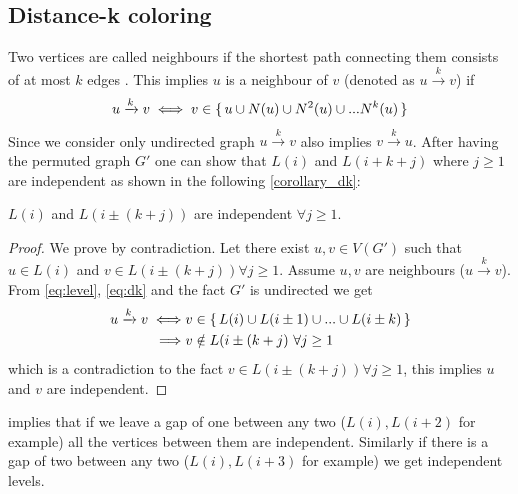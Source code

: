  \subsection{Distance-k coloring} \label{subsec:DK}
 Two vertices are called \DK neighbours if the shortest path connecting them consists of at most $k$ edges \cite{dist_k_def}. This implies $u$ is a \DK neighbour of $v$ (denoted as $u\xrightarrow{k}v$)  if
 \begin{equation}\label{eq:dk}
	  u\xrightarrow{k}v  \iff  v \in \set{ u \cup N(u) \cup N^2(u) \cup ... N^k(u) }	 
 \end{equation}
 Since we consider only undirected graph $u\xrightarrow{k}v$ also implies $v\xrightarrow{k}u$. 
  After having the permuted graph $G'$ one can show that $L(i)$ and $L(i+k+j)$ where $j\geq1$ are \DK independent as shown in the following \cref{corollary_dk}:
  \begin{corollary}\label{corollary_dk}
   $L(i)$ and $L(i\pm(k+j))$ are \DK independent $\forall j\geq1$. 
  \end{corollary}
  \begin{proof}
  	We prove by contradiction. Let there exist $u,v \in V(G')$ such that  $u \in L(i)$ and $v \in  L(i \pm (k+j)) \forall j\geq1$. Assume $u,v$ are \DK neighbours ($u\xrightarrow{k}v$). From \cref{eq:level}, \cref{eq:dk} and the fact $G'$ is undirected we get 
  	\begin{align*}
	  	u\xrightarrow{k}v \iff & v \in \set{L(i) \cup L(i \pm 1) \cup ... \cup L(i \pm k)} \\
	  	\implies & v \notin L(i \pm (k+j) \text{  } \forall j \geq 1
  	\end{align*}
  	which is a contradiction to the fact $v \in L(i \pm (k+j) ) \forall j \geq 1$, this implies $u$ and $v$ are \DK independent.
  \end{proof}

 implies that if we leave a gap of \emph{\atleast} one \level between any two \levels ($L(i), L(i+2)$ for example) all the vertices between them are \DONE independent. Similarly if there is a gap of \emph{\atleast} two \levels between any two \levels ($L(i), L(i+3)$ for example) we get \DTWO independent levels.
  
